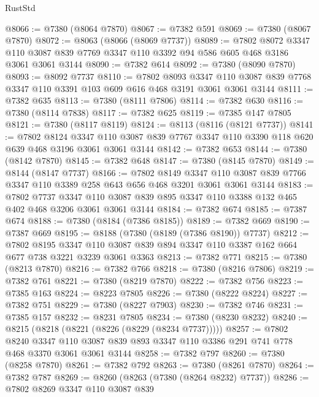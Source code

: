 \begin{lexlean}{RustStd}
\begin{coremodule}
@8066 := @7380 (@8064 @7870)
@8067 := @7382 @591
@8069 := @7380 (@8067 @7870)
@8072 := @8063 (@8066 (@8069 @7737))
@8089 := @7802
    @8072
    @3347
    @110
    @3087
    @839
    @7769
    @3347
    @110
    @3392
    @94
    @586
    @605
    @468
    @3186
    @3061
    @3061
    @3144
@8090 := @7382 @614
@8092 := @7380 (@8090 @7870)
@8093 := @8092 @7737
@8110 := @7802
    @8093
    @3347
    @110
    @3087
    @839
    @7768
    @3347
    @110
    @3391
    @103
    @609
    @616
    @468
    @3191
    @3061
    @3061
    @3144
@8111 := @7382 @635
@8113 := @7380 (@8111 @7806)
@8114 := @7382 @630
@8116 := @7380 (@8114 @7838)
@8117 := @7382 @625
@8119 := @7385 @147 @7805
@8121 := @7380 (@8117 @8119)
@8124 := @8113 (@8116 (@8121 @7737))
@8141 := @7802
    @8124
    @3347
    @110
    @3087
    @839
    @7767
    @3347
    @110
    @3390
    @118
    @620
    @639
    @468
    @3196
    @3061
    @3061
    @3144
@8142 := @7382 @653
@8144 := @7380 (@8142 @7870)
@8145 := @7382 @648
@8147 := @7380 (@8145 @7870)
@8149 := @8144 (@8147 @7737)
@8166 := @7802
    @8149
    @3347
    @110
    @3087
    @839
    @7766
    @3347
    @110
    @3389
    @258
    @643
    @656
    @468
    @3201
    @3061
    @3061
    @3144
@8183 := @7802
    @7737
    @3347
    @110
    @3087
    @839
    @895
    @3347
    @110
    @3388
    @132
    @465
    @402
    @468
    @3206
    @3061
    @3061
    @3144
@8184 := @7382 @674
@8185 := @7387 @674
@8188 := @7380 (@8184 (@7386 @8185))
@8189 := @7382 @669
@8190 := @7387 @669
@8195 := @8188 (@7380 (@8189 (@7386 @8190)) @7737)
@8212 := @7802
    @8195
    @3347
    @110
    @3087
    @839
    @894
    @3347
    @110
    @3387
    @162
    @664
    @677
    @738
    @3221
    @3239
    @3061
    @3363
@8213 := @7382 @771
@8215 := @7380 (@8213 @7870)
@8216 := @7382 @766
@8218 := @7380 (@8216 @7806)
@8219 := @7382 @761
@8221 := @7380 (@8219 @7870)
@8222 := @7382 @756
@8223 := @7385 @163
@8224 := @8223 @7805
@8226 := @7380 (@8222 @8224)
@8227 := @7382 @751
@8229 := @7380 (@8227 @7903)
@8230 := @7382 @746
@8231 := @7385 @157
@8232 := @8231 @7805
@8234 := @7380 (@8230 @8232)
@8240 := @8215 (@8218 (@8221 (@8226 (@8229 (@8234 @7737)))))
@8257 := @7802
    @8240
    @3347
    @110
    @3087
    @839
    @893
    @3347
    @110
    @3386
    @291
    @741
    @778
    @468
    @3370
    @3061
    @3061
    @3144
@8258 := @7382 @797
@8260 := @7380 (@8258 @7870)
@8261 := @7382 @792
@8263 := @7380 (@8261 @7870)
@8264 := @7382 @787
@8269 := @8260 (@8263 (@7380 (@8264 @8232) @7737))
@8286 := @7802
    @8269
    @3347
    @110
    @3087
    @839

\end{coremodule}
\end{lexlean}
